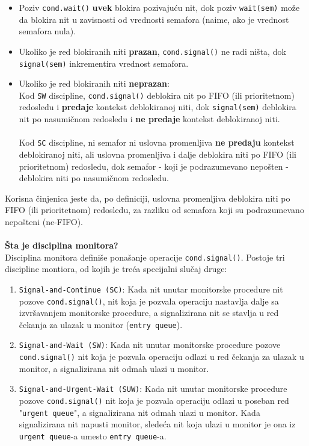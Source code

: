 \begin{itemize}
    \item Poziv \texttt{cond.wait()} \textbf{uvek} blokira pozivaju\'{c}u nit, dok poziv \texttt{wait(sem)} mo\v{z}e da blokira nit u zavisnosti od vrednosti semafora (naime, ako je vrednost semafora nula).
    \item Ukoliko je red blokiranih niti \textbf{prazan}, \texttt{cond.signal()} ne radi ni\v{s}ta, dok \texttt{signal(sem)} inkrementira vrednost semafora.
    \item Ukoliko je red blokiranih niti \textbf{neprazan}: \\Kod \texttt{SW} discipline, \texttt{cond.signal()} deblokira nit po FIFO (ili prioritetnom) redosledu i \textbf{predaje} kontekst deblokiranoj niti, dok \texttt{signal(sem)} deblokira nit po nasumi\v{c}nom redosledu i \textbf{ne predaje} kontekst deblokiranoj niti.\\\\Kod \texttt{SC} discipline, ni semafor ni uslovna promenljiva \textbf{ne predaju} kontekst deblokiranoj niti, ali uslovna promenljiva i dalje deblokira niti po FIFO (ili prioritetnom) redosledu, dok semafor - koji je podrazumevano nepo\v{s}ten - deblokira niti po nasumi\v{c}nom redosledu. 
\end{itemize}
Korisna \v{c}injenica jeste da, po definiciji, uslovna promenljiva deblokira niti po FIFO (ili prioritetnom) redosledu, za razliku od semafora koji su podrazumevano nepo\v{s}teni (ne-FIFO).
\\\\
\textbf{\v{S}ta je disciplina monitora?}\\
Disciplina monitora defini\v{s}e pona\v{s}anje operacije \texttt{cond.signal()}. Postoje tri discipline montiora, od kojih je tre\'{c}a specijalni slu\v{c}aj druge:
\begin{enumerate}
    \item \texttt{Signal-and-Continue (SC)}: Kada nit unutar monitorske procedure nit pozove \texttt{cond.signal()}, nit koja je pozvala operaciju nastavlja dalje sa izvr\v{s}avanjem monitorske procedure, a signalizirana nit se stavlja u red \v{c}ekanja za ulazak u monitor (\texttt{entry queue}).
    \item \texttt{Signal-and-Wait (SW)}: Kada nit unutar monitorske procedure pozove \texttt{cond.signal()} nit koja je pozvala operaciju odlazi u red \v{c}ekanja za ulazak u monitor, a signalizirana nit odmah ulazi u monitor.
    \item \texttt{Signal-and-Urgent-Wait (SUW)}:  Kada nit unutar monitorske procedure pozove \texttt{cond.signal()} nit koja je pozvala operaciju odlazi u poseban red "\texttt{urgent queue}", a signalizirana nit odmah ulazi u monitor. Kada signalizirana nit napusti monitor, slede\'{c}a nit koja ulazi u monitor je ona iz \texttt{urgent queue}-a umesto \texttt{entry queue}-a.
\end{enumerate}
